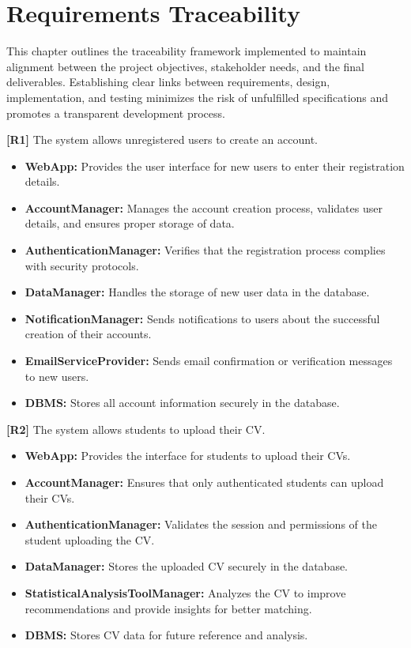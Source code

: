 \chapter{Requirements Traceability}
This chapter outlines the traceability framework implemented to maintain alignment between the project objectives, stakeholder needs, and the final deliverables. Establishing clear links between requirements, design, implementation, and testing minimizes the risk of unfulfilled specifications and promotes a transparent development process.

\textbf{[R1]} The system allows unregistered users to create an account.  
\begin{itemize}
    \item \textbf{WebApp:} Provides the user interface for new users to enter their registration details.
    \item \textbf{AccountManager:} Manages the account creation process, validates user details, and ensures proper storage of data.
    \item \textbf{AuthenticationManager:} Verifies that the registration process complies with security protocols.
    \item \textbf{DataManager:} Handles the storage of new user data in the database.
    \item \textbf{NotificationManager:} Sends notifications to users about the successful creation of their accounts.
    \item \textbf{EmailServiceProvider:} Sends email confirmation or verification messages to new users.
    \item \textbf{DBMS:} Stores all account information securely in the database.
\end{itemize}

\textbf{[R2]} The system allows students to upload their CV.  
\begin{itemize}
    \item \textbf{WebApp:} Provides the interface for students to upload their CVs.
    \item \textbf{AccountManager:} Ensures that only authenticated students can upload their CVs.
    \item \textbf{AuthenticationManager:} Validates the session and permissions of the student uploading the CV.
    \item \textbf{DataManager:} Stores the uploaded CV securely in the database.
    \item \textbf{StatisticalAnalysisToolManager:} Analyzes the CV to improve recommendations and provide insights for better matching.
    \item \textbf{DBMS:} Stores CV data for future reference and analysis.
\end{itemize}

